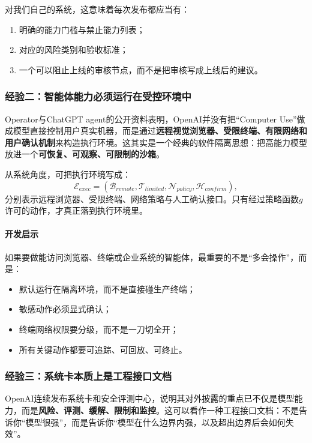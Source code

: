 \documentclass[12pt,a4paper]{article}
\begin{document}
对我们自己的系统，这意味着每次发布都应当有：
\begin{enumerate}
    \item 明确的能力门槛与禁止能力列表；
    \item 对应的风险类别和验收标准；
    \item 一个可以阻止上线的审核节点，而不是把审核写成上线后的建议。
\end{enumerate}

\subsubsection{经验二：智能体能力必须运行在受控环境中}

Operator与ChatGPT agent的公开资料表明，OpenAI并没有把“Computer Use”做成模型直接控制用户真实机器，而是通过\textbf{远程视觉浏览器、受限终端、有限网络和用户确认机制}来构造执行环境。这其实是一个经典的软件隔离思想：把高能力模型放进一个\textbf{可恢复、可观察、可限制的沙箱}。

从系统角度，可把执行环境写成：
\begin{equation}
\mathcal{E}_{exec} = (\mathcal{B}_{remote}, \mathcal{T}_{limited}, \mathcal{N}_{policy}, \mathcal{H}_{confirm}),
\end{equation}
分别表示远程浏览器、受限终端、网络策略与人工确认接口。只有经过策略函数$g$许可的动作，才真正落到执行环境里。

\paragraph{开发启示}

如果要做能访问浏览器、终端或企业系统的智能体，最重要的不是“多会操作”，而是：
\begin{itemize}
    \item 默认运行在隔离环境，而不是直接碰生产终端；
    \item 敏感动作必须显式确认；
    \item 终端网络权限要分级，而不是一刀切全开；
    \item 所有关键动作都要可追踪、可回放、可终止。
\end{itemize}

\subsubsection{经验三：系统卡本质上是工程接口文档}

OpenAI连续发布系统卡和安全评测中心，说明其对外披露的重点已不仅是模型能力，而是\textbf{风险、评测、缓解、限制和监控}。这可以看作一种工程接口文档：不是告诉你“模型很强”，而是告诉你“模型在什么边界内强，以及超出边界后会如何失效”。
\end{document}

